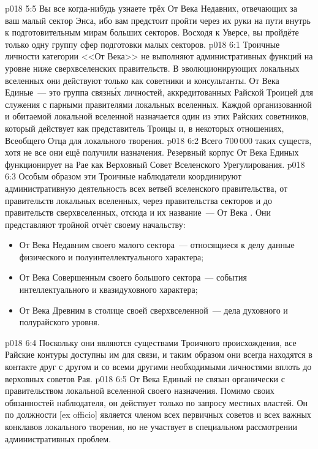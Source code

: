 \vs p018 5:5 Вы все когда\hyp{}нибудь узнаете трёх От Века Недавних, отвечающих за ваш малый сектор Энса, ибо вам предстоит пройти через их руки на пути внутрь к подготовительным мирам больших секторов. Восходя к Уверсе, вы пройдёте только одну группу сфер подготовки малых секторов.
\vs p018 6:1 Троичные личности категории <<От Века>> не выполняют административных функций на уровне ниже сверхвселенских правительств. В эволюционирующих локальных вселенных они действуют только как советники и консультанты. От Века Единые~--- это группа связн\'ых личностей, аккредитованных Райской Троицей для служения с парными правителями локальных вселенных. Каждой организованной и обитаемой локальной вселенной назначается один из этих Райских советников, который действует как представитель Троицы и, в некоторых отношениях, Всеобщего Отца для локального творения.
\vs p018 6:2 Всего 700\,000 таких существ, хотя не все они ещё получили назначения. Резервный корпус От Века Единых функционирует на Рае как Верховный Совет Вселенского Урегулирования.
\vs p018 6:3 Особым образом эти Троичные наблюдатели координируют административную деятельность всех ветвей вселенского правительства, от правительств локальных вселенных, через правительства секторов и до правительств сверхвселенных, отсюда и их название~--- От Века . Они представляют тройной отчёт своему начальству: \begin{itemize}\item От Века Недавним своего малого сектора~--- относящиеся к делу данные физического и полуинтеллектуального характера;\item От Века Совершенным своего большого сектора~--- события интеллектуального и квазидуховного характера;\item От Века Древним в столице своей сверхвселенной~--- дела духовного и полурайского уровня.\end{itemize}
\vs p018 6:4 Поскольку они являются существами Троичного происхождения, все Райские контуры доступны им для связи, и таким образом они всегда находятся в контакте друг с другом и со всеми другими необходимыми личностями вплоть до верховных советов Рая.
\vs p018 6:5 \pc От Века Единый не связан органически с правительством локальной вселенной своего назначения. Помимо своих обязанностей наблюдателя, он действует только по запросу местных властей. Он по должности [ex officio] является членом всех первичных советов и всех важных конклавов локального творения, но не участвует в специальном рассмотрении административных проблем.
